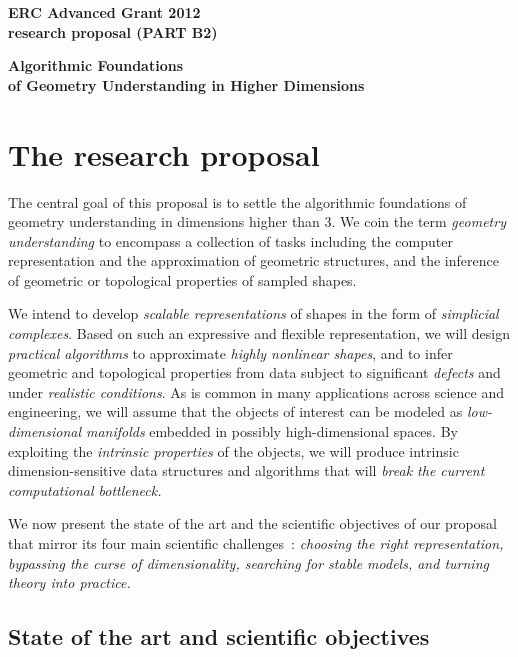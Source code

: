 \thispagestyle{empty}

\mbox{}\vspace{-3.5cm}

\begin{center}
{\Large
{\bf ERC Advanced Grant 2012 \\ research proposal (PART B2)}}
\vspace{1cm}

{\LARGE {\bf  Algorithmic Foundations \\ of 
Geometry Understanding in Higher Dimensions}

\vspace{3mm} 

}
\end{center}
\section{The research proposal}

The central goal of this proposal is to settle the algorithmic
foundations of geometry understanding in dimensions higher than 3.  We
coin the term {\em geometry understanding} to encompass a collection
of tasks including the computer representation and the approximation
of geometric structures, and the inference of geometric or topological
properties of sampled
shapes.  


We intend to develop {\em scalable representations} of shapes  in the form of {\em simplicial complexes}.
Based on such an expressive and flexible representation, we will design  {\em
practical algorithms} to approximate {\em highly nonlinear shapes}, and to
infer geometric and topological properties from data subject to
significant {\em defects} and under {\em realistic conditions}.
As is common in many applications across science and engineering, we
will assume that the objects of interest can be modeled as {\em
  low-dimensional manifolds} embedded in possibly high-dimensional
spaces. By exploiting the {\em intrinsic properties} of the objects,
we will produce intrinsic dimension-sensitive data structures and algorithms
that will {\em break the current computational
bottleneck.}  


We now present the state of the art and the scientific objectives of our proposal that mirror its four main scientific challenges~: {\em choosing the right representation, bypassing the curse of dimensionality, searching for stable models, and turning theory into practice.}


\subsection{State of the art and scientific objectives}

